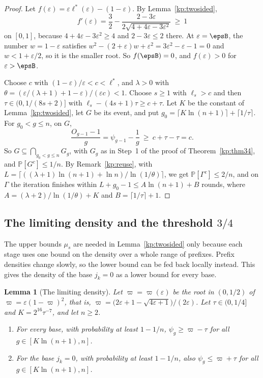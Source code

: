 \documentclass[11pt]{amsart}
\newtheorem{lemma}[theorem]{Lemma}
\theoremstyle{definition}
\theoremstyle{remark}
\newcommand{\eps}{\varepsilon}
\newcommand{\PP}{\mathbb{P}}
\begin{document}
\begin{proof}
Let $f(\eps)=\eps\ell^*(\eps)-(1-\eps)$. By Lemma~\ref{kp:twosided},
\[
  f'(\eps)=\frac32-\frac{2-3\eps}{2\sqrt{4+4\eps-3\eps^2}}\ \ge\ 1
\]
on $[0,1]$, because $4+4\eps-3\eps^2\ge 4$ and $2-3\eps\le 2$ there. At
$\eps=\epsB$, the number $w=1-\eps$ satisfies
$w^2-(2+\eps)w+\eps^2=3\eps^2-\eps-1=0$ and $w<1+\eps/2$, so it is the smaller
root. So $f(\epsB)=0$, and $f(\eps)>0$ for $\eps>\epsB$.

Choose $c$ with $(1-\eps)/\eps<c<\ell^*$, and $\lambda>0$ with
$\theta=(\eps/(\lambda+1)+1-\eps)/(\eps c)<1$. Choose $s\ge 1$ with $\ell_s>c$
and then $\tau\in(0,1/(8s+2)]$ with $\ell_s-(4s+1)\tau\ge c+\tau$. Let $K$ be
the constant of Lemma~\ref{kp:twosided}, let $G$ be its event, and put
$g_0=\lceil K\ln(n+1)\rceil+\lceil 1/\tau\rceil$. For $g_0<g\le n$, on $G$,
\[
  \frac{O_{g-1}-1}{g}=\psi_{g-1}-\frac1g\ \ge\ c+\tau-\tau=c .
\]
So $G\subseteq\bigcap_{g_0<g\le n}G_g$, with $G_g$ as in Step~1 of the proof of
Theorem~\ref{kp:thm34}, and $\PP[G^c]\le 1/n$. By Remark~\ref{kp:reuse}, with
$L=\lceil((\lambda+1)\ln(n+1)+\ln n)/\ln(1/\theta)\rceil$, we get
$\PP[\Gamma^c]\le 2/n$, and on $\Gamma$ the iteration finishes within
$L+g_0-1\le A\ln(n+1)+B$ rounds, where $A=(\lambda+2)/\ln(1/\theta)+K$ and
$B=\lceil 1/\tau\rceil+1$.
\end{proof}

\subsection{The limiting density and the threshold \texorpdfstring{$3/4$}{3/4}}\label{kp:sub-limit}

The upper bounds $\mu_s$ are needed in Lemma~\ref{kp:twosided} only because
each stage uses one bound on the density over a whole range of prefixes.
Prefix densities change slowly, so the lower bound can be fed back locally
instead. This gives the density of the base $j_k=0$ as a lower bound for every
base.

\begin{lemma}[The limiting density]\label{kp:limdens}
Let $\varpi=\varpi(\eps)$ be the root in $(0,1/2)$ of
$\varpi=\eps(1-\varpi)^2$, that is,
$\varpi=\bigl(2\eps+1-\sqrt{4\eps+1}\bigr)/(2\eps)$. Let $\tau\in(0,1/4]$ and
$K=2^{16}\tau^{-7}$, and let $n\ge 2$.
\begin{enumerate}[label=\textup{(\alph*)},leftmargin=2em]
\item For every base, with probability at least $1-1/n$,
  $\psi_g\ge\varpi-\tau$ for all $g\in[K\ln(n+1),n]$.
\item For the base $j_k=0$, with probability at least $1-1/n$, also
  $\psi_g\le\varpi+\tau$ for all $g\in[K\ln(n+1),n]$.
\end{enumerate}
\end{lemma}
\end{document}
